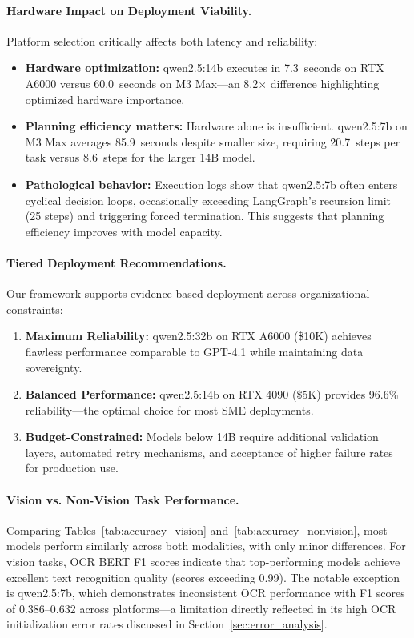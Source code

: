 \documentclass[conference]{IEEEtran}
\begin{document}
\paragraph{Hardware Impact on Deployment Viability.}
Platform selection critically affects both latency and reliability:

\begin{itemize}
    \item \textbf{Hardware optimization:} qwen2.5:14b executes in 7.3~seconds on RTX A6000 versus 60.0~seconds on M3 Max—an 8.2$\times$ difference highlighting optimized hardware importance.
    
    \item \textbf{Planning efficiency matters:} Hardware alone is insufficient. qwen2.5:7b on M3 Max averages 85.9~seconds despite smaller size, requiring 20.7~steps per task versus 8.6~steps for the larger 14B model.

    \item \textbf{Pathological behavior:} Execution logs show that qwen2.5:7b often enters cyclical decision loops, occasionally exceeding LangGraph's recursion limit (25 steps) and triggering forced termination. This suggests that planning efficiency improves with model capacity.
\end{itemize}

\paragraph{Tiered Deployment Recommendations.}
Our framework supports evidence-based deployment across organizational constraints:

\begin{enumerate}
    \item \textbf{Maximum Reliability:} qwen2.5:32b on RTX A6000 (\$10K) achieves flawless performance comparable to GPT-4.1 while maintaining data sovereignty.
    
    \item \textbf{Balanced Performance:} qwen2.5:14b on RTX 4090 (\$5K) provides 96.6\% reliability—the optimal choice for most SME deployments.
    
    \item \textbf{Budget-Constrained:} Models below 14B require additional validation layers, automated retry mechanisms, and acceptance of higher failure rates for production use.
\end{enumerate}

\paragraph{Vision vs. Non-Vision Task Performance.}
Comparing Tables~\ref{tab:accuracy_vision} and~\ref{tab:accuracy_nonvision}, most models perform similarly across both modalities, with only minor differences. For vision tasks, OCR BERT F1 scores indicate that top-performing models achieve excellent text recognition quality (scores exceeding 0.99). The notable exception is qwen2.5:7b, which demonstrates inconsistent OCR performance with F1 scores of 0.386--0.632 across platforms—a limitation directly reflected in its high OCR initialization error rates discussed in Section~\ref{sec:error_analysis}.
\end{document}
